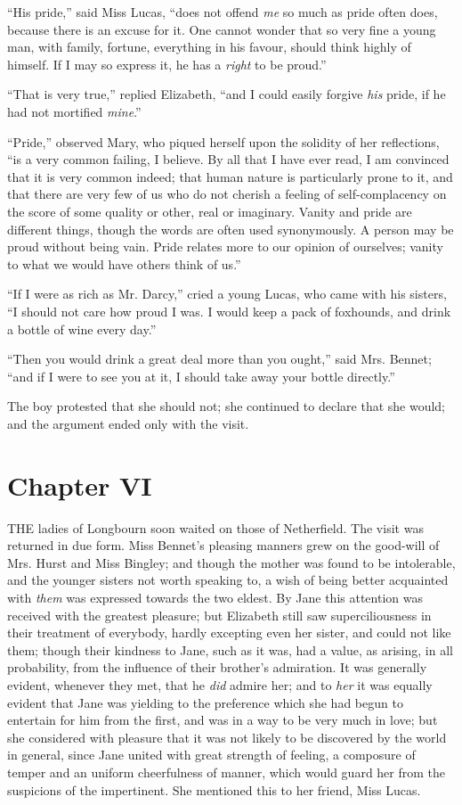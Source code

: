 \documentclass[12pt,openright]{book}
\begin{document}
“His pride,” said Miss Lucas, “does not offend \textit{me} so much as pride often does, because there is an excuse for it. One cannot wonder that so very fine a young man, with family, fortune, everything in his favour, should think highly of himself. If I may so express it, he has a \textit{right} to be proud.”

“That is very true,” replied Elizabeth, “and I could easily forgive \textit{his} pride, if he had not mortified \textit{mine}.”

“Pride,” observed Mary, who piqued herself upon the solidity of her reflections, “is a very common failing, I believe. By all that I have ever read, I am convinced that it is very common indeed; that human nature is particularly prone to it, and that there are very few of us who do not cherish a feeling of self-complacency on the score of some quality or other, real or imaginary. Vanity and pride are different things, though the words are often used synonymously. A person may be proud without being vain. Pride relates more to our opinion of ourselves; vanity to what we would have others think of us.”

“If I were as rich as Mr. Darcy,” cried a young Lucas, who came with his sisters, “I should not care how proud I was. I would keep a pack of foxhounds, and drink a bottle of wine every day.”

“Then you would drink a great deal more than you ought,” said Mrs. Bennet; “and if I were to see you at it, I should take away your bottle directly.”

The boy protested that she should not; she continued to declare that she would; and the argument ended only with the visit.

\chapter{Chapter VI}

\noindent  THE ladies of Longbourn soon waited on those of Netherfield. The visit was returned in due form. Miss Bennet’s pleasing manners grew on the good-will of Mrs. Hurst and Miss Bingley; and though the mother was found to be intolerable, and the younger sisters not worth speaking to, a wish of being better acquainted with \textit{them} was expressed towards the two eldest. By Jane this attention was received with the greatest pleasure; but Elizabeth still saw superciliousness in their treatment of everybody, hardly excepting even her sister, and could not like them; though their kindness to Jane, such as it was, had a value, as arising, in all probability, from the influence of their brother’s admiration. It was generally evident, whenever they met, that he \textit{did} admire her; and to \textit{her} it was equally evident that Jane was yielding to the preference which she had begun to entertain for him from the first, and was in a way to be very much in love; but she considered with pleasure that it was not likely to be discovered by the world in general, since Jane united with great strength of feeling, a composure of temper and an uniform cheerfulness of manner, which would guard her from the suspicions of the impertinent. She mentioned this to her friend, Miss Lucas.
\end{document}
